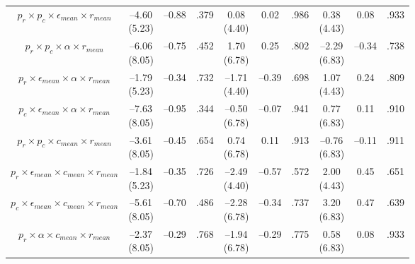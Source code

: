 \documentclass[
  11pt,
]{article}
\begin{document}
\begin{landscape}
\begin{ThreePartTable}
\begin{longtable}[t]{cccccccccc}
$p_r \times p_c \times \epsilon_{mean} \times r_{mean}$ & \makecell[c]{–4.60\\(5.23)} & –0.88 & .379 & \makecell[c]{0.08\\(4.40)} & 0.02 & .986 & \makecell[c]{0.38\\(4.43)} & 0.08 & .933\\
$p_r \times p_c \times \alpha \times r_{mean}$ & \makecell[c]{–6.06\\(8.05)} & –0.75 & .452 & \makecell[c]{1.70\\(6.78)} & 0.25 & .802 & \makecell[c]{–2.29\\(6.83)} & –0.34 & .738\\
$p_r \times \epsilon_{mean} \times \alpha \times r_{mean}$ & \makecell[c]{–1.79\\(5.23)} & –0.34 & .732 & \makecell[c]{–1.71\\(4.40)} & –0.39 & .698 & \makecell[c]{1.07\\(4.43)} & 0.24 & .809\\
\addlinespace
$p_c \times \epsilon_{mean} \times \alpha \times r_{mean}$ & \makecell[c]{–7.63\\(8.05)} & –0.95 & .344 & \makecell[c]{–0.50\\(6.78)} & –0.07 & .941 & \makecell[c]{0.77\\(6.83)} & 0.11 & .910\\
$p_r \times p_c \times c_{mean} \times r_{mean}$ & \makecell[c]{–3.61\\(8.05)} & –0.45 & .654 & \makecell[c]{0.74\\(6.78)} & 0.11 & .913 & \makecell[c]{–0.76\\(6.83)} & –0.11 & .911\\
$p_r \times \epsilon_{mean} \times c_{mean} \times r_{mean}$ & \makecell[c]{–1.84\\(5.23)} & –0.35 & .726 & \makecell[c]{–2.49\\(4.40)} & –0.57 & .572 & \makecell[c]{2.00\\(4.43)} & 0.45 & .651\\
$p_c \times \epsilon_{mean} \times c_{mean} \times r_{mean}$ & \makecell[c]{–5.61\\(8.05)} & –0.70 & .486 & \makecell[c]{–2.28\\(6.78)} & –0.34 & .737 & \makecell[c]{3.20\\(6.83)} & 0.47 & .639\\
$p_r \times \alpha \times c_{mean} \times r_{mean}$ & \makecell[c]{–2.37\\(8.05)} & –0.29 & .768 & \makecell[c]{–1.94\\(6.78)} & –0.29 & .775 & \makecell[c]{0.58\\(6.83)} & 0.08 & .933\\

\end{longtable}
\end{ThreePartTable}
\end{landscape}
\end{document}
